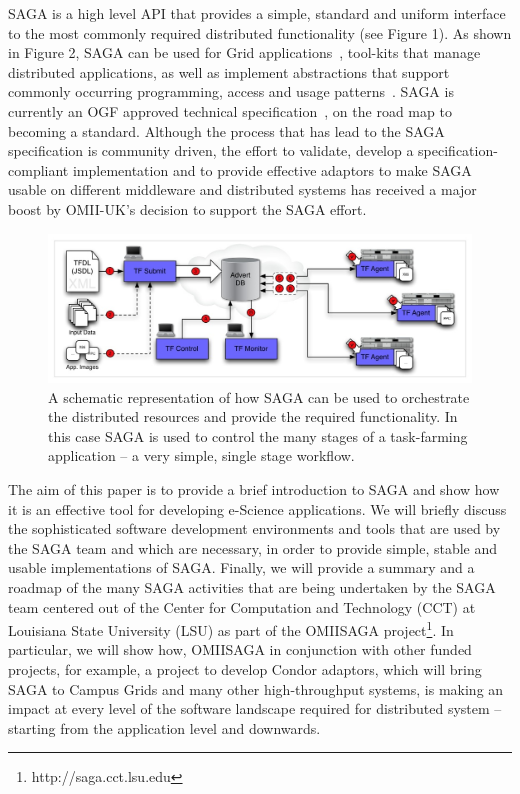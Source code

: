\documentclass[a4paper,10pt]{article}
\begin{document}
SAGA is a high level API that provides a simple, standard and uniform
interface to the most commonly required distributed functionality (see
Figure 1).  As shown in Figure 2, SAGA can be used for Grid
applications~\cite{saga_escience07, saga_tg08}, tool-kits that manage
distributed applications, as well as implement abstractions that
support commonly occurring programming, access and usage
patterns~\cite{saga_mapreduce}.  SAGA is currently an OGF approved
technical specification~\cite{saga_gfd90}, on the road map to becoming
a standard.  Although the process that has lead to the SAGA
specification is community driven, the effort to validate, develop a
specification-compliant implementation and to provide effective
adaptors to make SAGA usable on different middleware and distributed
systems has received a major boost by OMII-UK's decision to support
the SAGA effort.

\begin{figure}
\begin{center}
\includegraphics[scale=0.60]{bigpicture_shrimpFarm.jpg}
\end{center}
\caption{A schematic representation of how SAGA can be used to
  orchestrate the distributed resources and provide the required
  functionality. In this case SAGA is used to control the many stages
  of a task-farming application -- a very simple, single stage
  workflow.}
\label{fig:saga_arch}
\end{figure}

The aim of this paper is to provide a brief introduction to SAGA and show
how it is an effective tool for developing e-Science applications.  We
will briefly discuss the sophisticated software development
environments and tools that are used by the SAGA team and which are
necessary, in order to provide simple, stable and usable
implementations of SAGA.  Finally, we will provide a summary and a
roadmap of the many SAGA activities that are being undertaken by the
SAGA team centered out of the Center for Computation and Technology
(CCT) at Louisiana State University (LSU) as part of the OMIISAGA
project\footnote{http://saga.cct.lsu.edu}.  In particular, we will
show how, OMIISAGA in conjunction with other funded projects, for
example, a project to develop Condor adaptors, which will bring SAGA
to Campus Grids and many other high-throughput systems, is making an
impact at every level of the software landscape required for
distributed system -- starting from the application level and
downwards.

 

\end{document}
